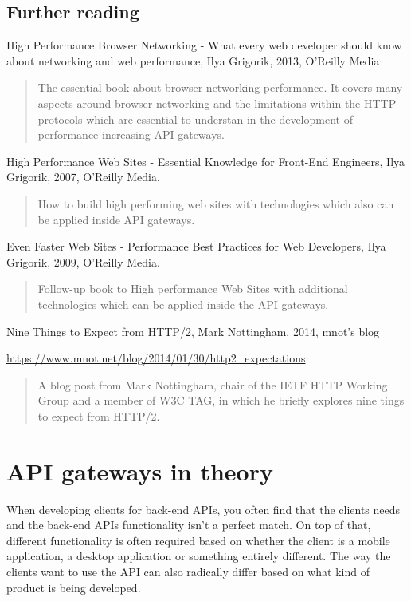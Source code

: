 \documentclass{cslthse-msc}
\begin{document}
\section{Further reading}
High Performance Browser Networking - What every web developer should know about networking and web performance, Ilya Grigorik, 2013, O'Reilly Media

\begin{quote}
	The essential book about browser networking performance. It covers many aspects around browser networking and the limitations within the HTTP protocols which are essential to understan in the development of performance increasing API gateways.
\end{quote}

\vspace{5mm}
\noindent High Performance Web Sites - Essential Knowledge for Front-End Engineers, Ilya Grigorik, 2007, O'Reilly Media.

\begin{quote}
	How to build high performing web sites with technologies which also can be applied inside API gateways.
\end{quote}

\vspace{5mm}
\noindent Even Faster Web Sites - Performance Best Practices for Web Developers, Ilya Grigorik, 2009, O'Reilly Media.

\begin{quote}
	Follow-up book to High performance Web Sites with additional technologies which can be applied inside the API gateways.
\end{quote}

\vspace{5mm}
\noindent Nine Things to Expect from HTTP/2, Mark Nottingham, 2014, mnot's blog

\noindent \url{https://www.mnot.net/blog/2014/01/30/http2_expectations}

\begin{quote}
	A blog post from Mark Nottingham, chair of the IETF HTTP Working Group and a member of W3C TAG, in which he briefly explores nine tings to expect from HTTP/2.
\end{quote}

\chapter{API gateways in theory}
When developing clients for back-end APIs, you often find that the clients needs and the back-end APIs functionality isn't a perfect match. On top of that, different functionality is often required based on whether the client is a mobile application, a desktop application or something entirely different. The way the clients want to use the API can also radically differ based on what kind of product is being developed.
\end{document}

